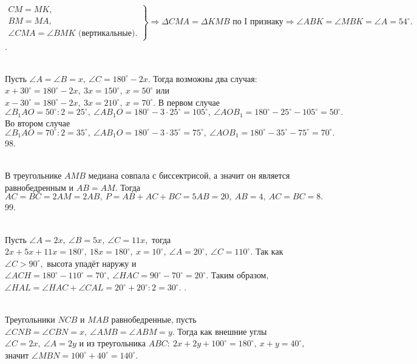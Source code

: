 $\left.\begin{array}{l}CM=MK,\\
BM=MA,\\
\angle CMA=\angle BMK\text{ (вертикальные).}\end{array}\right\}\Rightarrow \Delta CMA=\Delta KMB\text{ по I признаку}\Rightarrow \angle ABK=\angle MBK=\angle A=54^\circ.$\newpage
{}. \begin{figure}[ht!]
\end{figure}\\
Пусть $\angle A=\angle B=x,\ \angle C=180^\circ-2x.$ Тогда возможны два случая: $x+30^\circ=180^\circ-2x,\ 3x=150^\circ,\ x=50^\circ$ или $x-30^\circ=180^\circ-2x,\
3x=210^\circ,\ x=70^\circ.$ В первом случае  $\angle B_1AO=50^\circ:2=25^\circ,\ \angle AB_1O=180^\circ-3\cdot25^\circ=105^\circ,\ \angle AOB_1=180^\circ-25^\circ-105^\circ=50^\circ.$ Во втором случае  $\angle B_1AO=70^\circ:2=35^\circ,\ \angle AB_1O=180^\circ-3\cdot35^\circ=75^\circ,\ \angle AOB_1=180^\circ-35^\circ-75^\circ=70^\circ.$\\
98. \begin{figure}[ht!]
\end{figure}\\
В треугольнике $AMB$ медиана совпала с биссектрисой, а значит он является равнобедренным и $AB=AM.$ Тогда $AC=BC=2AM=2AB,\ P=AB+AC+BC=5AB=20,\ AB=4,\ AC=BC=8.$\\
99.\begin{figure}[ht!]
\end{figure}\\
Пусть $\angle A=2x,\ \angle B=5x,\ \angle C=11x,$ тогда $2x+5x+11x=180^\circ,\ 18x=180^\circ,\ x=10^\circ,\ \angle A=20^\circ,\ \angle C=110^\circ.$ Так как $\angle C>90^\circ,$ высота упадёт наружу и  $\angle ACH=180^\circ-110^\circ=70^\circ,\ \angle HAC=90^\circ-70^\circ=20^\circ.$ Таким образом, $\angle HAL=\angle HAC+\angle CAL=20^\circ+20^\circ:2=30^\circ.$\newpage
\noindent100. \begin{figure}[ht!]
\end{figure}\\
Треугольники $NCB$ и $MAB$ равнобедренные, пусть $\angle CNB=\angle CBN=x,\ \angle AMB=\angle ABM=y.$ Тогда как внешние углы $\angle C=2x,\ \angle A=2y$ и из треугольника $ABC:\ 2x+2y+100^\circ=180^\circ,\ x+y=40^\circ,$ значит $\angle MBN=100^\circ+40^\circ=140^\circ.$\\
